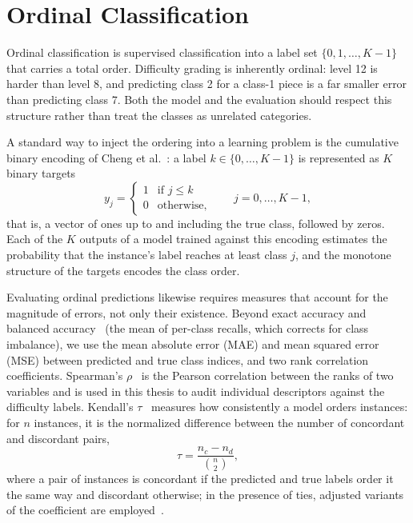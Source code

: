 \section{Ordinal Classification}
\label{sec:prelim_ordinal}
Ordinal classification is supervised classification into a label set $\{0, 1, \dots, K-1\}$ that carries a total order. Difficulty grading is inherently ordinal: level 12 is harder than level 8, and predicting class 2 for a class-1 piece is a far smaller error than predicting class 7. Both the model and the evaluation should respect this structure rather than treat the classes as unrelated categories.

A standard way to inject the ordering into a learning problem is the cumulative binary encoding of Cheng et al.~\cite{cheng2008ordinal}: a label $k \in \{0, \dots, K-1\}$ is represented as $K$ binary targets
\begin{equation}
    y_j = \begin{cases} 1 & \text{if } j \le k \\ 0 & \text{otherwise,} \end{cases} \qquad j = 0, \dots, K-1,
    \label{eq:cumulative_encoding}
\end{equation}
that is, a vector of ones up to and including the true class, followed by zeros. Each of the $K$ outputs of a model trained against this encoding estimates the probability that the instance's label reaches at least class $j$, and the monotone structure of the targets encodes the class order.

Evaluating ordinal predictions likewise requires measures that account for the magnitude of errors, not only their existence. Beyond exact accuracy and balanced accuracy~\cite{brodersen2010balanced} (the mean of per-class recalls, which corrects for class imbalance), we use the mean absolute error (MAE) and mean squared error (MSE) between predicted and true class indices, and two rank correlation coefficients. Spearman's $\rho$~\cite{spearman1904proof} is the Pearson correlation between the ranks of two variables and is used in this thesis to audit individual descriptors against the difficulty labels. Kendall's $\tau$~\cite{kendall1938new} measures how consistently a model orders instances: for $n$ instances, it is the normalized difference between the number of concordant and discordant pairs,
\begin{equation}
    \tau = \frac{n_c - n_d}{\binom{n}{2}},
    \label{eq:kendall}
\end{equation}
where a pair of instances is concordant if the predicted and true labels order it the same way and discordant otherwise; in the presence of ties, adjusted variants of the coefficient are employed~\cite{kendall1945ties}.


